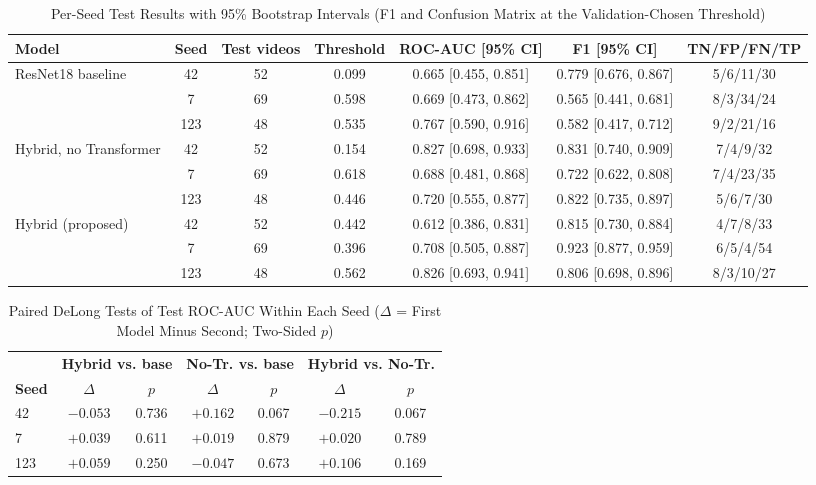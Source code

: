 \documentclass[conference]{IEEEtran}
\begin{document}
\begin{table}[t]
\caption{Per-Seed Test Results with 95\% Bootstrap Intervals (F1 and Confusion Matrix at the Validation-Chosen Threshold)}
\label{tab:seeds}
\centering
\footnotesize
\setlength{\tabcolsep}{4pt}
\begin{tabular}{lcccccc}
\toprule
\textbf{Model} & \textbf{Seed} & \textbf{Test videos} & \textbf{Threshold} &
\textbf{ROC-AUC [95\% CI]} & \textbf{F1 [95\% CI]} & \textbf{TN/FP/FN/TP} \\
\midrule
\multirow{3}{*}{ResNet18 baseline} & 42 & 52 & 0.099 & 0.665 [0.455, 0.851] & 0.779 [0.676, 0.867] & 5/6/11/30 \\
 & 7 & 69 & 0.598 & 0.669 [0.473, 0.862] & 0.565 [0.441, 0.681] & 8/3/34/24 \\
 & 123 & 48 & 0.535 & 0.767 [0.590, 0.916] & 0.582 [0.417, 0.712] & 9/2/21/16 \\
\midrule
\multirow{3}{*}{Hybrid, no Transformer} & 42 & 52 & 0.154 & 0.827 [0.698, 0.933] & 0.831 [0.740, 0.909] & 7/4/9/32 \\
 & 7 & 69 & 0.618 & 0.688 [0.481, 0.868] & 0.722 [0.622, 0.808] & 7/4/23/35 \\
 & 123 & 48 & 0.446 & 0.720 [0.555, 0.877] & 0.822 [0.735, 0.897] & 5/6/7/30 \\
\midrule
\multirow{3}{*}{Hybrid (proposed)} & 42 & 52 & 0.442 & 0.612 [0.386, 0.831] & 0.815 [0.730, 0.884] & 4/7/8/33 \\
 & 7 & 69 & 0.396 & 0.708 [0.505, 0.887] & 0.923 [0.877, 0.959] & 6/5/4/54 \\
 & 123 & 48 & 0.562 & 0.826 [0.693, 0.941] & 0.806 [0.698, 0.896] & 8/3/10/27 \\
\bottomrule
\end{tabular}
\end{table}

\begin{table}[t]
\caption{Paired DeLong Tests of Test ROC-AUC Within Each Seed ($\Delta$ = First Model Minus Second; Two-Sided $p$)}
\label{tab:delong}
\centering
\footnotesize
\setlength{\tabcolsep}{4pt}
\begin{tabular}{lcccccc}
\toprule
 & \multicolumn{2}{c}{\textbf{Hybrid vs. base}} & \multicolumn{2}{c}{\textbf{No-Tr. vs. base}} & \multicolumn{2}{c}{\textbf{Hybrid vs. No-Tr.}} \\
\textbf{Seed} & $\Delta$ & $p$ & $\Delta$ & $p$ & $\Delta$ & $p$ \\
\midrule
42 & $-0.053$ & 0.736 & $+0.162$ & 0.067 & $-0.215$ & 0.067 \\
7 & $+0.039$ & 0.611 & $+0.019$ & 0.879 & $+0.020$ & 0.789 \\
123 & $+0.059$ & 0.250 & $-0.047$ & 0.673 & $+0.106$ & 0.169 \\
\bottomrule
\end{tabular}
\end{table}
\end{document}
